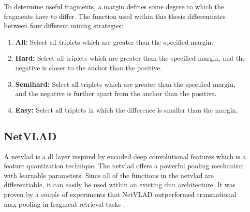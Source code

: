 \noindent To determine useful fragments, a margin defines some degree to which the fragments have to differ. The function used within this thesis differentiates between four different mining strategies:
%
\begin{enumerate}
	\item \textbf{All:} Select all triplets which are greater than the specified margin.
	\item \textbf{Hard:} Select all triplets which are greater than the specified margin, and the negative is closer to the anchor than the positive.
	\item \textbf{Semihard:} Select all triplets which are greater than the specified margin, and the negative is further apart from the anchor than the positive.
	\item \textbf{Easy:} Select all triplets in which the difference is smaller than the margin.
\end{enumerate}
%
\subsection{NetVLAD}
A \ac{netvlad} is a \ac{dl} layer inspired by encoded deep convolutional features which is a feature quantization technique. The \ac{netvlad} offers a powerful pooling mechanism with learnable parameters. Since all of the functions in the \ac{netvlad} are differentiable, it can easily be used within an existing \ac{dnn} architecture. It was proven by a couple of experiments that NetVLAD outperformed transnational max-pooling in fragment retrieval tasks \cite{Arandjelovic15}. 